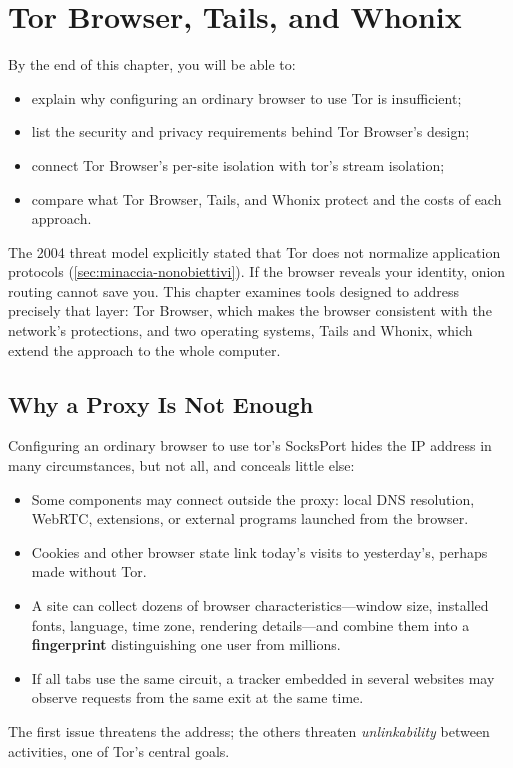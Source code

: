 \chapter{Tor Browser, Tails, and Whonix}\label{cap:23-browser}

\begin{obiettivi}
By the end of this chapter, you will be able to:
\begin{itemize}[nosep]
  \item explain why configuring an ordinary browser to use Tor is insufficient;
  \item list the security and privacy requirements behind Tor Browser's design;
  \item connect Tor Browser's per-site isolation with tor's stream isolation;
  \item compare what Tor Browser, Tails, and Whonix protect and the costs of each approach.
\end{itemize}
\end{obiettivi}

The 2004 threat model explicitly stated that Tor does not normalize application protocols (\cref{sec:minaccia-nonobiettivi}). If the browser reveals your identity, onion routing cannot save you. This chapter examines tools designed to address precisely that layer: Tor Browser, which makes the browser consistent with the network's protections, and two operating systems, Tails and Whonix, which extend the approach to the whole computer.

\section{Why a Proxy Is Not Enough}\label{sec:browser-proxy}

Configuring an ordinary browser to use tor's SocksPort hides the IP address in many circumstances, but not all, and conceals little else:
\begin{itemize}
  \item Some components may connect outside the proxy: local DNS resolution, WebRTC, extensions, or external programs launched from the browser.
  \item Cookies and other browser state link today's visits to yesterday's, perhaps made without Tor.
  \item A site can collect dozens of browser characteristics---window size, installed fonts, language, time zone, rendering details---and combine them into a \textbf{fingerprint} distinguishing one user from millions.
  \item If all tabs use the same circuit, a tracker embedded in several websites may observe requests from the same exit at the same time.
\end{itemize}
The first issue threatens the address; the others threaten \emph{unlinkability} between activities, one of Tor's central goals.

